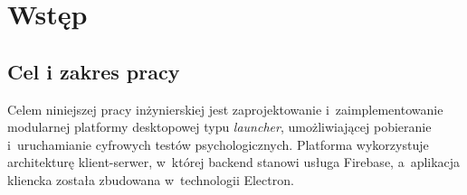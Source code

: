 \documentclass[12pt, a4paper, oneside]{report}
\begin{document}








\tableofcontents
\newpage





\chapter{Wstęp}
\label{chap:wstep}



\section{Cel i zakres pracy}
\label{sec:cel}

Celem niniejszej pracy inżynierskiej jest zaprojektowanie i~zaimplementowanie modularnej platformy desktopowej typu \textit{launcher}, umożliwiającej pobieranie i~uruchamianie cyfrowych testów psychologicznych. Platforma wykorzystuje architekturę klient-serwer, w~której backend stanowi usługa Firebase, a~aplikacja kliencka została zbudowana w~technologii Electron.
\end{document}
